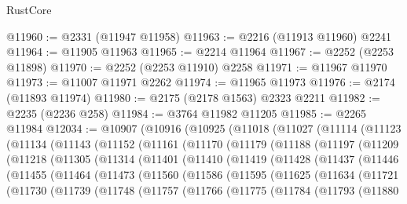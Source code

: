\begin{lexlean}{RustCore}
\begin{coremodule}
@11960 := @2331 (@11947 @11958)
@11963 := @2216 (@11913 @11960) @2241
@11964 := @11905 @11963
@11965 := @2214 @11964
@11967 := @2252 (@2253 @11898)
@11970 := @2252 (@2253 @11910) @2258
@11971 := @11967 @11970
@11973 := @11007 @11971 @2262
@11974 := @11965 @11973
@11976 := @2174 (@11893 @11974)
@11980 := @2175 (@2178 @1563) @2323 @2211
@11982 := @2235 (@2236 @258)
@11984 := @3764 @11982 @11205
@11985 := @2265 @11984
@12034 := @10907
    (@10916
      (@10925
        (@11018
          (@11027
            (@11114
              (@11123
                (@11134
                  (@11143
                    (@11152
                      (@11161
                        (@11170
                          (@11179
                            (@11188
                              (@11197
                                (@11209
                                  (@11218
                                    (@11305
                                      (@11314
                                        (@11401
                                          (@11410
                                            (@11419
                                              (@11428
                                                (@11437
                                                  (@11446
                                                    (@11455
                                                      (@11464
                                                        (@11473
                                                          (@11560
                                                            (@11586
                                                              (@11595
                                                                (@11625
                                                                  (@11634
                                                                    (@11721
                                                                      (@11730
                                                                        (@11739
                                                                          (@11748
                                                                            (@11757
                                                                              (@11766
                                                                                (@11775
                                                                                  (@11784
                                                                                    (@11793
                                                                                      (@11880

\end{coremodule}
\end{lexlean}
